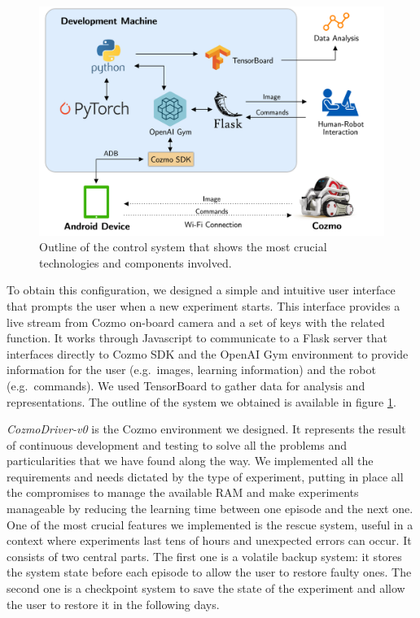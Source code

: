 \documentclass[10pt,twocolumn,letterpaper]{article}
\begin{document}
\begin{figure}[tbp]
    \centering
    \includegraphics[width=0.97\columnwidth]{cozmo-system.png}
    \caption[Outline of the control system]{Outline of the control system that shows the most crucial technologies and components involved.}
    \label{system}
\end{figure}

To obtain this configuration, we designed a simple and intuitive user interface that prompts the user when a new experiment starts.
This interface provides a live stream from Cozmo on-board camera and a set of keys with the related function.
It works through Javascript to communicate to a Flask server that interfaces directly to Cozmo SDK and the OpenAI Gym environment to provide information for the user (e.g.\ images, learning information) and the robot (e.g.\ commands).
We used TensorBoard to gather data for analysis and representations.
The outline of the system we obtained is available in figure \ref{system}.

\textit{CozmoDriver-v0} is the Cozmo environment we designed.
It represents the result of continuous development and testing to solve all the problems and particularities that we have found along the way.
We implemented all the requirements and needs dictated by the type of experiment, putting in place all the compromises to manage the available RAM and make experiments manageable by reducing the learning time between one episode and the next one.
One of the most crucial features we implemented is the rescue system, useful in a context where experiments last tens of hours and unexpected errors can occur.
It consists of two central parts.
The first one is a volatile backup system: it stores the system state before each episode to allow the user to restore faulty ones.
The second one is a checkpoint system to save the state of the experiment and allow the user to restore it in the following days.
%
\end{document}
